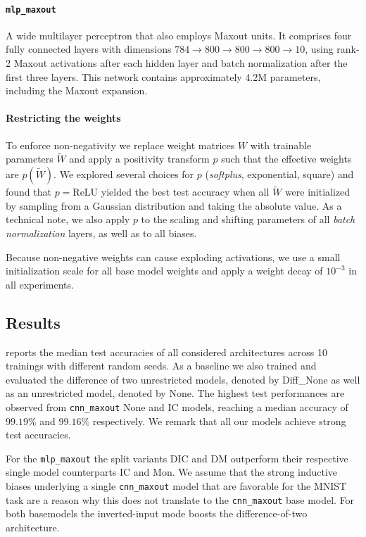 \paragraph{\texttt{mlp\_maxout}}
A wide multilayer perceptron that also employs Maxout units.
It comprises four fully connected layers with dimensions $784 \rightarrow 800 \rightarrow 800 \rightarrow 800 \rightarrow 10$, using rank-2 Maxout activations after each hidden layer and batch normalization after the first three layers.
This network contains approximately 4.2M parameters, including the Maxout expansion.

\paragraph{Restricting the weights}

To enforce non-negativity we replace weight matrices $W$ with trainable parameters $\tilde{W}$ and apply a positivity transform $p$ such that the effective weights are $p(\tilde{W})$.
We explored several choices for $p$ (\eg \emph{softplus}, exponential, square) and found that $p=\text{ReLU}$ yielded the best test accuracy when all $\tilde{W}$ were initialized by sampling from a Gaussian distribution and taking the absolute value.
As a technical note, we also apply $p$ to the scaling and shifting parameters of all \emph{batch normalization} layers, as well as to all biases.

Because non-negative weights can cause exploding activations, we use a small initialization scale for all base model weights and apply a weight decay of $10^{-3}$ in all experiments.

\subsection{Results} \label{subsec:dic_results}



 reports the median test accuracies of all considered architectures across 10 trainings with different random seeds. As a baseline we also trained and evaluated the difference of two unrestricted models, denoted by 
Diff\_None as well as an unrestricted model, denoted by None. The highest test performances are observed from \texttt{cnn\_maxout} None and IC models, reaching a median accuracy of $99.19\%$ and $99.16\%$ respectively. We remark that all our models achieve strong test accuracies.

For the \texttt{mlp\_maxout} the split variants DIC and DM outperform their respective single model counterparts IC and Mon. We assume that the strong inductive biases underlying a single \texttt{cnn\_maxout} model that are favorable for the MNIST task are a reason why this does not translate to the \texttt{cnn\_maxout} base model.
For both basemodels the inverted-input mode boosts the difference-of-two architecture.

